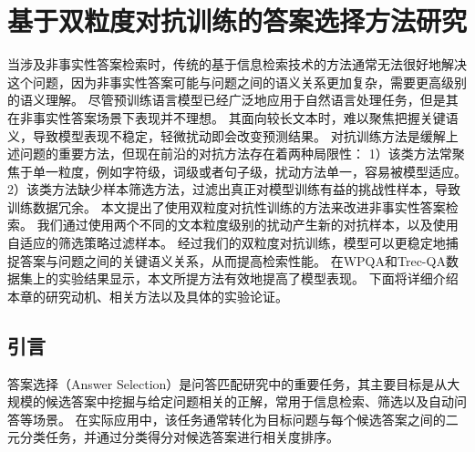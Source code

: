 \chapter{基于双粒度对抗训练的答案选择方法研究}

当涉及非事实性答案检索时，传统的基于信息检索技术的方法通常无法很好地解决这个问题，因为非事实性答案可能与问题之间的语义关系更加复杂，需要更高级别的语义理解。
尽管预训练语言模型已经广泛地应用于自然语言处理任务，但是其在非事实性答案场景下表现并不理想。
其面向较长文本时，难以聚焦把握关键语义，导致模型表现不稳定，轻微扰动即会改变预测结果。
对抗训练方法是缓解上述问题的重要方法，但现在前沿的对抗方法存在着两种局限性：
1）该类方法常聚焦于单一粒度，例如字符级，词级或者句子级，扰动方法单一，容易被模型适应。
2）该类方法缺少样本筛选方法，过滤出真正对模型训练有益的挑战性样本，导致训练数据冗余。
本文提出了使用双粒度对抗性训练的方法来改进非事实性答案检索。
我们通过使用两个不同的文本粒度级别的扰动产生新的对抗样本，以及使用自适应的筛选策略过滤样本。
经过我们的双粒度对抗训练，模型可以更稳定地捕捉答案与问题之间的关键语义关系，从而提高检索性能。
在WPQA和Trec-QA数据集上的实验结果显示，本文所提方法有效地提高了模型表现。
下面将详细介绍本章的研究动机、相关方法以及具体的实验论证。


\section{引言}

答案选择（Answer Selection）是问答匹配研究中的重要任务，其主要目标是从大规模的候选答案中挖掘与给定问题相关的正解，常用于信息检索、筛选以及自动问答等场景。
在实际应用中，该任务通常转化为目标问题与每个候选答案之间的二元分类任务，并通过分类得分对候选答案进行相关度排序。

